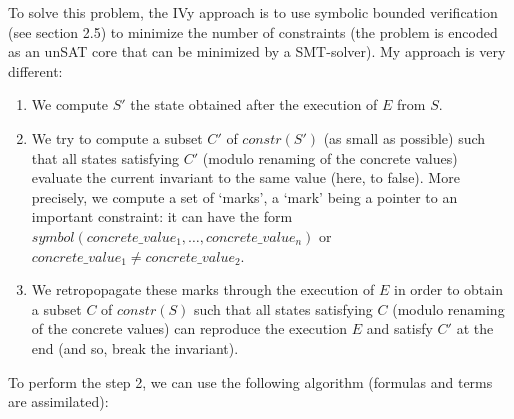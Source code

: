 \documentclass[11pt,a4paper,oldfontcommands,openany]{memoir}
\begin{document}
    To solve this problem, the IVy approach is to use symbolic bounded verification (see section 2.5) to minimize the number of constraints (the problem is encoded as an unSAT core that can be minimized by a SMT-solver).
    My approach is very different:
    \begin{enumerate}
        \item We compute \(S'\) the state obtained after the execution of \(E\) from \(S\).
        \item We try to compute a subset \(C'\) of \(constr(S')\) (as small as possible) such that all states satisfying \(C'\) (modulo renaming of the concrete values)
        evaluate the current invariant to the same value (here, to false). More precisely, we compute a set of `marks', a `mark' being a pointer to an important constraint:
        it can have the form \(symbol(concrete\_value_1,\ldots,concrete\_value_n)\) or \(concrete\_value_1 \neq concrete\_value_2\).
        \item We retropopagate these marks through the execution of \(E\) in order to obtain a subset \(C\) of \(constr(S)\) such that
        all states satisfying \(C\) (modulo renaming of the concrete values) can reproduce the execution \(E\) and satisfy \(C'\) at the end (and so, break the invariant).
    \end{enumerate}

    To perform the step 2, we can use the following algorithm (formulas and terms are assimilated):
\end{document}
